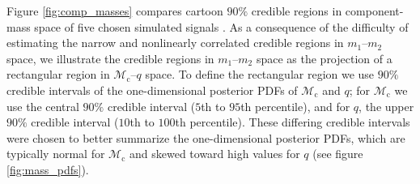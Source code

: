 Figure \ref{fig:comp_masses} compares cartoon $90\%$ credible regions in component-mass space of five chosen simulated signals \citep[cf.][]{Hannam_2013,Chatziioannou_2014}.  As a consequence of the difficulty of estimating the narrow and nonlinearly correlated credible regions in $m_1$--$m_2$ space, we illustrate the credible regions in $m_1$--$m_2$ space as the projection of a rectangular region in $\mathcal{M}_\mathrm{c}$--$q$ space.  To define the rectangular region we use $90\%$ credible intervals of the one-dimensional posterior PDFs of $\mathcal{M}_\mathrm{c}$ and $q$; for $\mathcal{M}_\mathrm{c}$ we use the central $90\%$ credible interval ($5$th to $95$th percentile), and for $q$, the upper $90\%$ credible interval ($10$th to $100$th percentile).  These differing credible intervals were chosen to better summarize the one-dimensional posterior PDFs, which are typically normal for $\mathcal{M}_\mathrm{c}$ and skewed toward high values for $q$ (see figure \ref{fig:mass_pdfs}).
